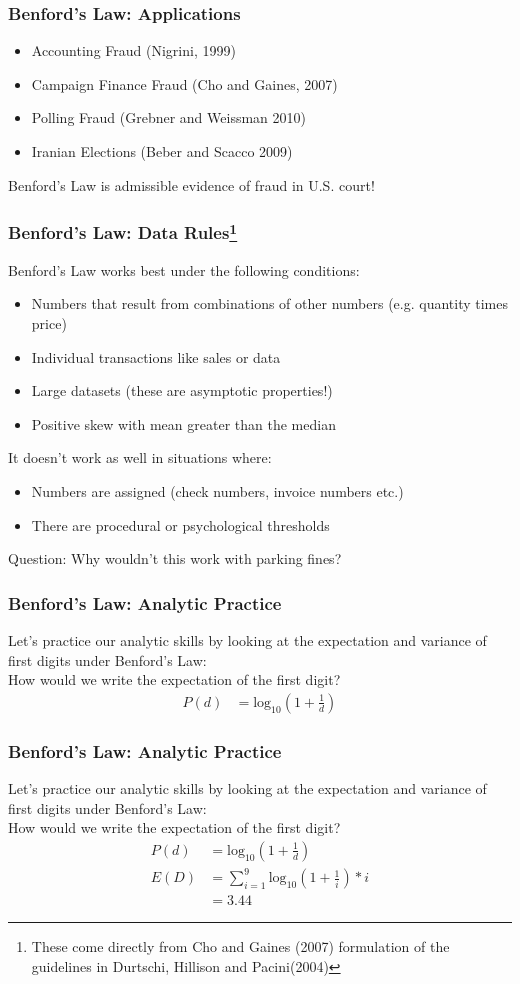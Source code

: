 \documentclass{beamer}
\begin{document}
\begin{frame}\frametitle{Benford's Law: Applications}
\begin{itemize}
\item Accounting Fraud (Nigrini, 1999)
\item Campaign Finance Fraud (Cho and Gaines, 2007)
\item Polling Fraud (Grebner and Weissman 2010)
\item Iranian Elections (Beber and Scacco 2009)
\end{itemize}
Benford's Law is admissible evidence of fraud in U.S. court!
\end{frame}

\begin{frame}\frametitle{Benford's Law: Data Rules\footnote{These come directly from Cho and Gaines (2007) formulation of the guidelines in Durtschi, Hillison and Pacini(2004)}}
Benford's Law works best under the following conditions:
\begin{itemize}
\item Numbers that result from combinations of other numbers (e.g. quantity times price)
\item Individual transactions like sales or data
\item Large datasets (these are asymptotic properties!)
\item Positive skew with mean greater than the median
\end{itemize}
It doesn't work as well in situations where:
\begin{itemize}
\item Numbers are assigned (check numbers, invoice numbers etc.)
\item There are procedural or psychological thresholds
\end{itemize}
Question: Why wouldn't this work with parking fines?
\end{frame}

\begin{frame}\frametitle{Benford's Law: Analytic Practice}
Let's practice our analytic skills by looking at the expectation and variance of first digits under Benford's Law: \\
How would we write the expectation of the first digit?
\begin{align*}
P(d) &= \text{log}_{10}(1 + \frac{1}{d})
\end{align*}
\end{frame}

\begin{frame}\frametitle{Benford's Law: Analytic Practice}
Let's practice our analytic skills by looking at the expectation and variance of first digits under Benford's Law: \\
How would we write the expectation of the first digit?
\begin{align*}
P(d) &= \text{log}_{10}(1 + \frac{1}{d}) \\
E(D) &= \sum_{i=1}^9 \text{log}_{10}(1 + \frac{1}{i})*i \\
&= 3.44 
\end{align*}
\end{frame}
\end{document}
